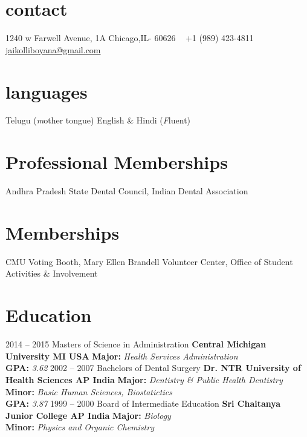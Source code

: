\documentclass[]{friggeri-cv} %
\begin{document}


\begin{aside} %
\section{contact}
1240 w Farwell Avenue, 1A
Chicago,IL- 60626
~
+1 (989) 423-4811
~
\href{mailto:jaikolliboyana@gmail.com}{jaikolliboyana@gmail.com}
\section{languages}
Telugu ({\emph mother tongue})
English \& Hindi ({\emph Fluent})
\section{Professional Memberships}
Andhra Pradesh State Dental Council, Indian Dental Association
\section{Memberships}
CMU Voting Booth, Mary Ellen Brandell Volunteer Center, Office of Student Activities \& Involvement
\end{aside}


\section{Education}

\begin{entrylist}
\entry
{2014 -- 2015}
{Masters of Science in Administration}
{\bf Central Michigan University MI USA}
{{\bf Major:} \emph{Health Services Administration}\\ {\bf GPA:} \emph{3.62}}
\entry
{2002 -- 2007}
{Bachelors of Dental Surgery}
{\bf Dr. NTR University of Health Sciences AP India}
{{\bf Major:} \emph{Dentistry \& Public Health Dentistry} \\ {\bf Minor:} \emph{Basic Human Sciences, Biostatictics} \\ {\bf GPA:} \emph{3.87}}
\entry
{1999 -- 2000}
{Board of Intermediate Education}
{\bf Sri Chaitanya Junior College AP India}
{{\bf Major:} \emph{Biology} \\ {\bf Minor:} \emph{Physics and Organic Chemistry}}
\end{entrylist}
\end{document}
